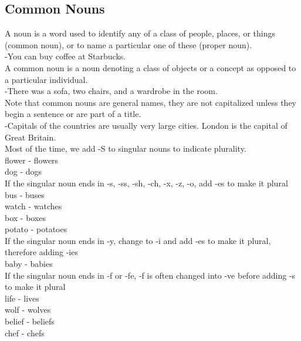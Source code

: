 \documentclass[12pt,a4paper]{article} %
\begin{document}
\subsection{Common Nouns}

A noun is a word used to identify any of a class of people, places, or things (common noun),
or to name a particular one of these (proper noun).\\

-You can buy coffee at Starbucks.\\


A common noun is a noun denoting a class of objects or a concept as opposed to a particular individual.\\

-There was a sofa, two chairs, and a wardrobe in the room.\\

Note that common nouns are general names, they are not capitalized unless they begin a sentence or are part of a title.\\

-Capitals of the countries are usually very large cities. London is the capital of Great Britain.\\

Most of the time, we add -S to singular nouns to indicate plurality.\\

flower - flowers\\
dog - dogs\\

If the singular noun ends in -s, -ss, -sh, -ch, -x, -z, -o, add -es to make it plural\\

bus - buses\\
watch - watches\\
box - boxes\\
potato - potatoes\\

If the singular noun ends in -y, change to -i and add -es to make it plural, therefore adding -ies\\

baby - babies\\

If the singular noun ends in -f or -fe, -f is often changed into -ve before adding -s to make it plural\\

life - lives\\
wolf - wolves\\
belief - beliefs\\
chef - chefs\\
\end{document}

